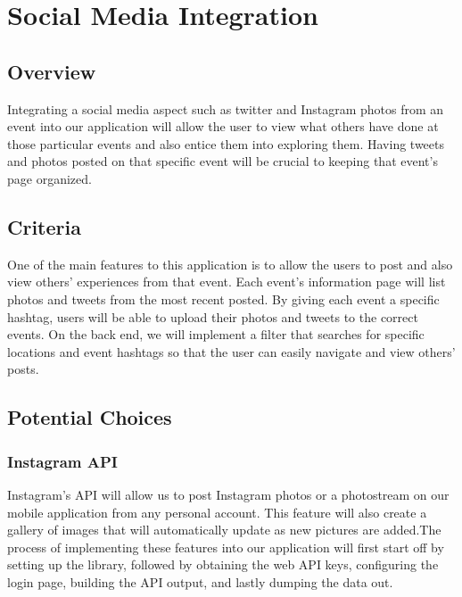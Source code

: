 \documentclass[onecolumn, draftclsnofoot,10pt, compsoc]{IEEEtran}
\begin{document}
\section{Social Media Integration}
\subsection{Overview}
Integrating a social media aspect such as twitter and Instagram photos from an event into our application will allow the user to view what others have done at those particular events and also entice them into exploring them. Having tweets and photos posted on that specific event will be crucial to keeping that event’s page organized. 

\subsection{Criteria}
One of the main features to this application is to allow the users to post and also view others’ experiences from that event. Each event’s information page will list photos and tweets from the most recent posted. By giving each event a specific hashtag, users will be able to upload their photos and tweets to the correct events. On the back end, we will implement a filter that searches for specific locations and event hashtags so that the user can easily navigate and view others’ posts. 

\subsection{Potential Choices}
\subsubsection{Instagram API}
Instagram's API will allow us to post Instagram photos or a photostream on our mobile application from any personal account. This feature will also create a gallery of images that will automatically update as new pictures are added.The process of implementing these features into our application will first start off by setting up the library, followed by obtaining the web API keys, configuring the login page, building the API output, and lastly dumping the data out. \cite{InstaAPI}
\end{document}
